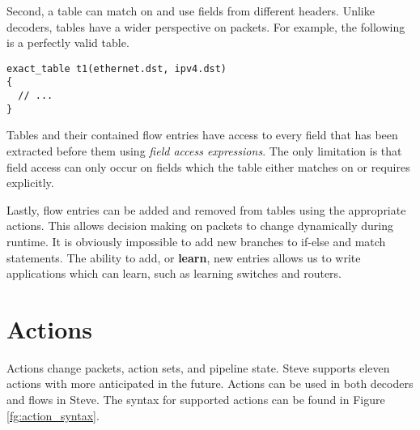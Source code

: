 Second, a table can match on and use fields from different headers. Unlike decoders, tables have a wider perspective on packets. For example, the following is a perfectly valid table. 

\begin{lstlisting}
exact_table t1(ethernet.dst, ipv4.dst)
{
  // ...
}
\end{lstlisting}

Tables and their contained flow entries have access to every field that has been extracted before them using \textit{field access expressions}. The only limitation is that field access can only occur on fields which the table either matches on or requires explicitly.

Lastly, flow entries can be added and removed from tables using the appropriate actions. This allows decision making on packets to change dynamically during runtime. It is obviously impossible to add new branches to if-else and match statements. The ability to add, or \textbf{learn}, new entries allows us to write applications which can learn, such as learning switches and routers.

\section{Actions} \label{action_tut}

Actions change packets, action sets, and pipeline state. Steve supports eleven actions with more anticipated in the future. Actions can be used in both decoders and flows in Steve. The syntax for supported actions can be found in Figure \ref{fg:action_syntax}.

